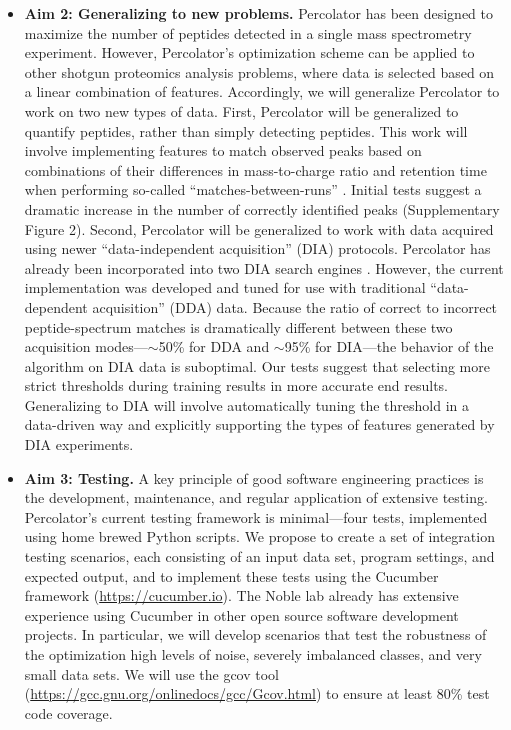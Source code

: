 \documentclass{article}
\begin{document}
\begin{itemize}
\item {\bf Aim 2: Generalizing to new problems.} Percolator has been designed to maximize the number of peptides detected in a single mass spectrometry experiment. However, Percolator's optimization scheme can be applied to other shotgun proteomics analysis problems, where data is selected based on a linear combination of features. Accordingly, we will generalize Percolator to work on two new types of data.  First, Percolator will be generalized to quantify peptides, rather than simply detecting peptides. This work will involve implementing features to match observed peaks based on combinations of their differences in mass-to-charge ratio and retention time when performing so-called ``matches-between-runs''  \cite{zhang:covariation}. Initial tests suggest a dramatic increase in the number of correctly identified peaks \cite{the:focus} (Supplementary Figure 2). Second, Percolator will be generalized to work with data acquired using newer ``data-independent acquisition'' (DIA) protocols.  Percolator has already been incorporated into two DIA search engines \cite{ting:pecan, searle:chromatogram}. However, the current implementation was developed and tuned for use with traditional ``data-dependent acquisition'' (DDA) data. Because the ratio of correct to incorrect peptide-spectrum matches is dramatically different between these two acquisition modes---$\sim$50\% for DDA and $\sim$95\% for DIA---the behavior of the algorithm on DIA data is suboptimal.  Our tests suggest that selecting more strict thresholds during training results in more accurate end results. Generalizing to DIA will involve automatically tuning the threshold in a data-driven way and explicitly supporting the types of features generated by DIA experiments.

\item {\bf Aim 3: Testing.} A key principle of good software engineering practices is the development, maintenance, and regular application of extensive testing. Percolator's current testing framework is minimal---four tests, implemented using home brewed Python scripts.  We propose to create a set of integration testing scenarios, each consisting of an input data set, program settings, and expected output, and to implement these tests using the Cucumber framework (\href{https://cucumber.io} {https://cucumber.io}). The Noble lab already has extensive experience using Cucumber in other open source software development projects. In particular, we will develop scenarios that test the robustness of the optimization high levels of noise, severely imbalanced classes, and very small data sets. We will use the gcov tool (\href{https://gcc.gnu.org/onlinedocs/gcc/Gcov.html} {https://gcc.gnu.org/onlinedocs/gcc/Gcov.html}) to ensure at least 80\% test code coverage.%


\end{itemize}
\end{document}
